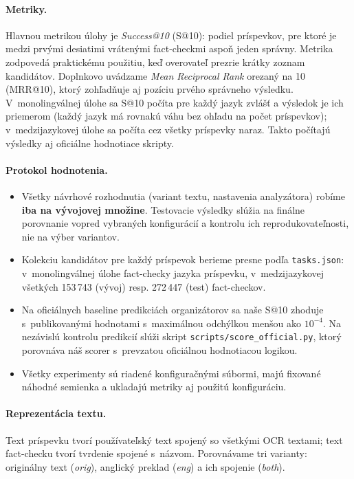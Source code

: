 \documentclass[11pt,a4paper]{article}
\makeatletter
\newcommand{\sat}{S@10}
\makeatother
\begin{document}
\paragraph{Metriky.}
Hlavnou metrikou úlohy je \emph{Success@10} (\sat{}): podiel príspevkov, pre ktoré je medzi prvými desiatimi vrátenými fact-checkmi aspoň jeden správny.
Metrika zodpovedá praktickému použitiu, keď overovateľ prezrie krátky zoznam kandidátov.
Doplnkovo uvádzame \emph{Mean Reciprocal Rank} orezaný na 10 (MRR@10), ktorý zohľadňuje aj pozíciu prvého správneho výsledku.
V~monolingválnej úlohe sa \sat{} počíta pre každý jazyk zvlášť a výsledok je ich priemerom (každý jazyk má rovnakú váhu bez ohľadu na počet príspevkov); v~medzijazykovej úlohe sa počíta cez všetky príspevky naraz.
Takto počítajú výsledky aj oficiálne hodnotiace skripty.

\paragraph{Protokol hodnotenia.}
\begin{itemize}
  \item Všetky návrhové rozhodnutia (variant textu, nastavenia analyzátora) robíme \textbf{iba na vývojovej množine}.
  Testovacie výsledky slúžia na finálne porovnanie vopred vybraných konfigurácií a kontrolu ich reprodukovateľnosti, nie na výber variantov.
  \item Kolekciu kandidátov pre každý príspevok berieme presne podľa \texttt{tasks.json}: v~monolingválnej úlohe fact-checky jazyka príspevku, v~medzijazykovej všetkých 153\,743 (vývoj) resp. 272\,447 (test) fact-checkov.
  \item Na oficiálnych baseline predikciách organizátorov sa naše \sat{} zhoduje s~publikovanými hodnotami s~maximálnou odchýlkou menšou ako $10^{-4}$.
  Na nezávislú kontrolu predikcií slúži skript \texttt{scripts/score\_official.py}, ktorý porovnáva náš scorer s~prevzatou oficiálnou hodnotiacou logikou.
  \item Všetky experimenty sú riadené konfiguračnými súbormi, majú fixované náhodné semienka a ukladajú metriky aj použitú konfiguráciu.
\end{itemize}

\paragraph{Reprezentácia textu.}
Text príspevku tvorí používateľský text spojený so všetkými OCR textami; text fact-checku tvorí tvrdenie spojené s~názvom.
Porovnávame tri varianty: originálny text (\emph{orig}), anglický preklad (\emph{eng}) a ich spojenie (\emph{both}).
\end{document}
